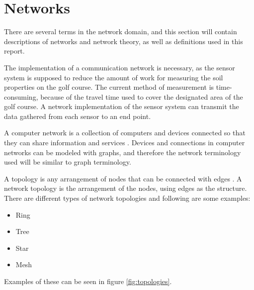 \section{Networks} \label{cha:networksprot}
There are several terms in the network domain, and this section will contain descriptions of networks and network theory, as well as definitions used in this report. 

The implementation of a communication network is necessary, as the sensor system is supposed to reduce the amount of work for measuring the soil properties on the golf course. The current method of measurement is time-consuming, because of the travel time used to cover the designated area of the golf course. A network implementation of the sensor system can transmit the data gathered from each sensor to an end point.

A computer network is a collection of computers and devices connected so that they can share information and services \cite{mansfield2009computer}. Devices and connections in computer networks can be modeled with graphs, and therefore the network terminology used will be similar to graph terminology. 



A topology is any arrangement of nodes that can be connected with edges \cite[p.~628]{discMath}. A network topology is the arrangement of the nodes, using edges as the structure. There are different types of network topologies and following are some examples:
\begin{itemize}
	\item Ring
	\item Tree
	\item Star
	\item Mesh
\end{itemize}

Examples of these can be seen in figure \ref{fig:topologies}.

